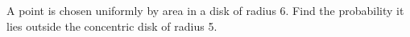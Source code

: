 A point is chosen uniformly by area in a disk of radius 6. Find the probability it lies outside the concentric disk of radius 5.

